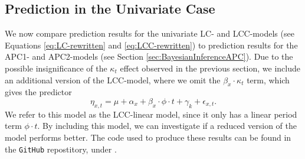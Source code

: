 
\subsection{Prediction in the Univariate Case}
\label{sec:uv-pred}
We now compare prediction results for the univariate LC- and LCC-models (see Equations \ref{eq:LC-rewritten} and \ref{eq:LCC-rewritten}) to prediction results for the APC1- and APC2-models (see Section \ref{sec:BayesianInferenceAPC}). Due to the possible insignificance of the $\kappa_t$ effect observed in the previous section, we include an additional version of the LCC-model, where we omit the $\beta_x\cdot \kappa_t$ term, which gives the predictor
\begin{equation}
    \eta_{x,t} = \mu + \alpha_x + \beta_x\cdot \phi \cdot t + \gamma_k + \epsilon_{x,t}.
\end{equation}
We refer to this model as the LCC-linear model, since it only has a linear period term $\phi \cdot t$. By including this model, we can investigate if a reduced version of the model performs better. The code used to produce these results can be found in the \texttt{GitHub} repostitory, under . 

